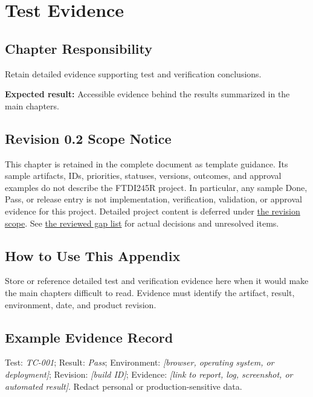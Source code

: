 \chapter{Test Evidence}
\section{Chapter Responsibility}
\label{Section:TestEvidenceResponsibility}
Retain detailed evidence supporting test and verification conclusions.

\noindent\textbf{Expected result:} Accessible evidence behind the results summarized in the main chapters.

\section{Revision 0.2 Scope Notice}
\label{Section:DeferredTestEvidence}
\begin{fsaNote}
This chapter is retained in the complete document as template guidance.
Its sample artifacts, IDs, priorities, statuses, versions, outcomes, and
approval examples do not describe the FTDI245R project. In particular, any
sample Done, Pass, or release entry is not implementation, verification,
validation, or approval evidence for this project. Detailed project content
is deferred under \hyperref[Section:ProjectScope]{the revision scope}.
See \hyperref[Table:ProjectGapReview]{the reviewed gap list} for actual
decisions and unresolved items.
\end{fsaNote}

\section{How to Use This Appendix}
Store or reference detailed test and verification evidence here when it would make the main chapters difficult to read. Evidence must identify the artifact, result, environment, date, and product revision.
\section{Example Evidence Record}
Test: \textit{TC-001}; Result: \textit{Pass}; Environment: \textit{[browser, operating system, or deployment]}; Revision: \textit{[build ID]}; Evidence: \textit{[link to report, log, screenshot, or automated result]}. Redact personal or production-sensitive data.
